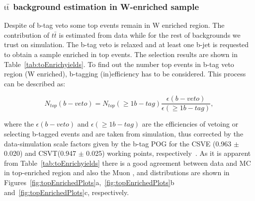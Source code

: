 \subsubsection{\texorpdfstring{$\rm{t\bar{t}}$ background estimation in W-enriched sample}{tt background estimation in W-enriched sample}}

Despite of b-tag veto some top events remain in W enriched region. The contribution of $t\bar{t}$ is estimated from data while for the rest of backgrounds we trust on simulation. The b-tag veto is relaxed and at least one b-jet is requested to obtain a sample enriched in top events. The selection results are shown in Table~\ref{tab:toEnrichyields}. To find out the number top events in b-tag veto region (W enriched), b-tagging (in)efficiency has to be considered. This process can be described as:
\begin{linenomath}
\begin{equation}
\label{eq:topEst}
N_{top}(b-veto) = N_{top}(\geq1b-tag) \frac{\epsilon(b-veto)}{\epsilon(\geq1b-tag)},
\end{equation}
\end{linenomath}
where the $\epsilon(b-veto)$ and $\epsilon(\geq1b-tag)$ are the efficiencies of vetoing or selecting b-tagged events and are taken from simulation, thus corrected by the data-simulation scale factors given by the b-tag POG for the CSVE (0.963 $\pm$ 0.020) and CSVT(0.947 $\pm$ 0.025) working points, respectively~\cite{CMS-BTV-AN-12-470}. As it is apparent from Table~\ref{tab:toEnrichyields} there is a good agreement between data and MC in top-enriched region and also the Muon \pT, \mttwo and \mt distributions are shown in Figures~\ref{fig:topEnrichedPlots}a,~\ref{fig:topEnrichedPlots}b and~\ref{fig:topEnrichedPlots}c, respectively.


